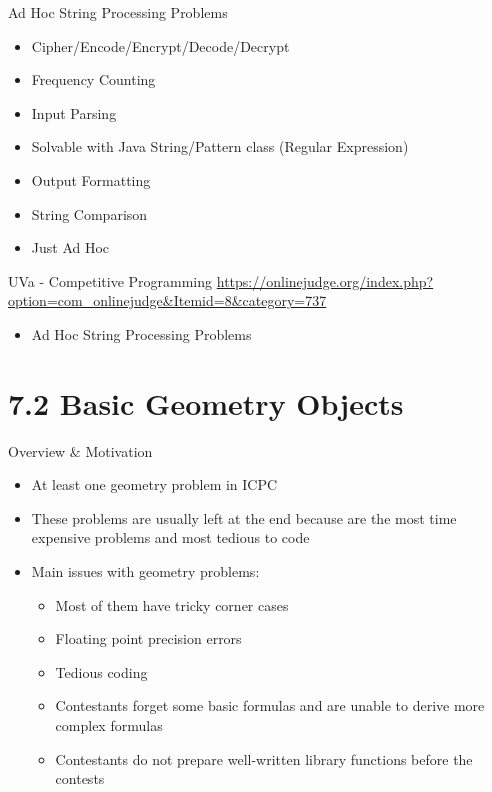 \documentclass{beamer}
\begin{document}
\begin{frame}{Ad Hoc String Processing Problems}
    \begin{itemize}
        \item Cipher/Encode/Encrypt/Decode/Decrypt
        \item Frequency Counting
        \item Input Parsing
        \item Solvable with Java String/Pattern class (Regular Expression)
        \item Output Formatting
        \item String Comparison
        \item Just Ad Hoc
    \end{itemize}
\end{frame}

\begin{frame}{UVa - Competitive Programming}
    \url{https://onlinejudge.org/index.php?option=com_onlinejudge&Itemid=8&category=737}
    \begin{itemize}
        \item Ad Hoc String Processing Problems
    \end{itemize}
\end{frame}

\section{7.2 Basic Geometry Objects}
\begin{frame}{Overview \& Motivation}
    \begin{itemize}
        \item At least one geometry problem in ICPC
        \item These problems are usually left at the end because are the most time expensive problems and most tedious to code
        \item Main issues with geometry problems:
            \begin{itemize}
                \item Most of them have tricky corner cases
                \item Floating point precision errors
                \item Tedious coding
                \item Contestants forget some basic formulas and are unable to derive more complex formulas
                \item Contestants do not prepare well-written library functions before the contests
            \end{itemize}
    \end{itemize}
\end{frame}
\end{document}

